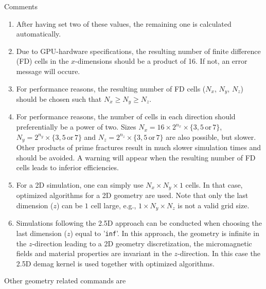 Comments
\begin{enumerate}
 \item After having set two of these values, the remaining one is calculated automatically. 
 \item Due to GPU-hardware specifications, the resulting number of finite difference (FD) cells in the $x$-dimensions should be a product of 16.  If not, an error message will occure.
 \item For performance reasons, the resulting number of FD cells ($N_x$, $N_y$, $N_z$) should be chosen such that $N_x\geq N_y \geq N_z$.
 \item For performance reasons, the number of cells in each direction should preferentially be a power of two. Sizes $N_x=16\times2^{n_x}\times\{3,5 \mathrm{\,or\,} 7\}$, $N_y=2^{n_y}\times\{3,5 \mathrm{\,or\,} 7\}$ and $N_z=2^{n_z}\times\{3,5 \mathrm{\,or\,} 7\}$ are also possible, but slower. Other products of prime fractures result in much slower simulation times and should be avoided.  A warning will appear when the resulting number of FD cells leads to inferior efficiencies.
 \item For a 2D simulation, one can simply use $N_x \times N_y \times 1$ cells. In that case, optimized algorithms for a 2D geometry are used. Note that only the last dimension ($z$) can be $1$ cell large, e.g., $1 \times N_y \times N_z$ is not a valid grid size.
 \item Simulations following the 2.5D approach can be conducted when choosing the last dimension ($z$) equal to '\texttt{inf}'.  In this approach, the geometry is infinite in the $z$-direction leading to a 2D geometry discretization, the micromagnetic fields and material properties are invariant in the $z$-direction.  In this case the 2.5D demag kernel is used together with optimized algorithms.
\end{enumerate}

Other geometry related commands are

